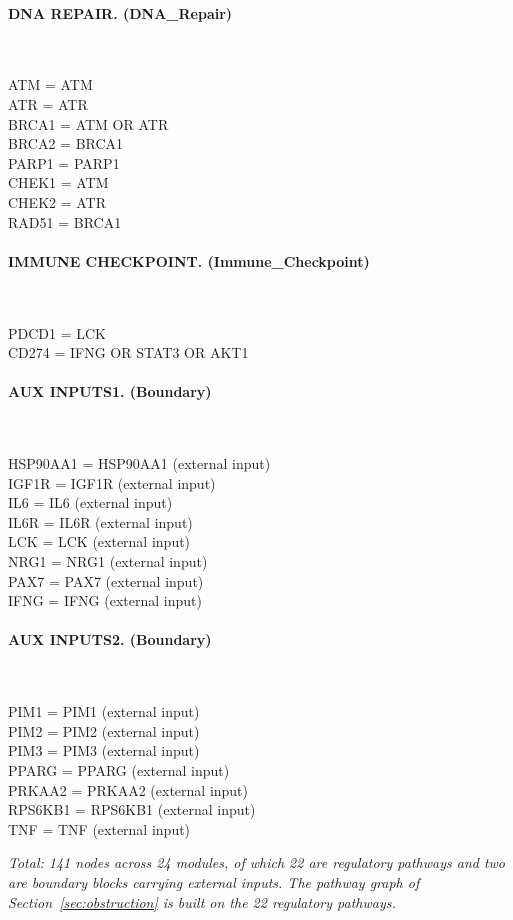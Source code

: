 \paragraph{DNA REPAIR. (DNA\_Repair)}\mbox{}\\
\begin{flushleft}\ttfamily\small
ATM = ATM\\
ATR = ATR\\
BRCA1 = ATM OR ATR\\
BRCA2 = BRCA1\\
PARP1 = PARP1\\
CHEK1 = ATM\\
CHEK2 = ATR\\
RAD51 = BRCA1\\
\end{flushleft}

\paragraph{IMMUNE CHECKPOINT. (Immune\_Checkpoint)}\mbox{}\\
\begin{flushleft}\ttfamily\small
PDCD1 = LCK\\
CD274 = IFNG OR STAT3 OR AKT1\\
\end{flushleft}

\paragraph{AUX INPUTS1. (Boundary)}\mbox{}\\
\begin{flushleft}\ttfamily\small
HSP90AA1 = HSP90AA1  (external input)\\
IGF1R = IGF1R  (external input)\\
IL6 = IL6  (external input)\\
IL6R = IL6R  (external input)\\
LCK = LCK  (external input)\\
NRG1 = NRG1  (external input)\\
PAX7 = PAX7  (external input)\\
IFNG = IFNG  (external input)\\
\end{flushleft}

\paragraph{AUX INPUTS2. (Boundary)}\mbox{}\\
\begin{flushleft}\ttfamily\small
PIM1 = PIM1  (external input)\\
PIM2 = PIM2  (external input)\\
PIM3 = PIM3  (external input)\\
PPARG = PPARG  (external input)\\
PRKAA2 = PRKAA2  (external input)\\
RPS6KB1 = RPS6KB1  (external input)\\
TNF = TNF  (external input)\\
\end{flushleft}

\noindent\textit{Total: 141 nodes across 24 modules, of which 22 are regulatory pathways and two are boundary blocks carrying external inputs. The pathway graph of Section~\ref{sec:obstruction} is built on the 22 regulatory pathways.}
